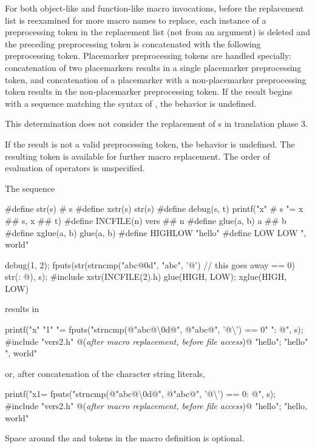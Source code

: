 \pnum
For both object-like and function-like macro invocations, before the
replacement list is reexamined for more macro names to replace,
each instance of a
\tcode{\#\#}
preprocessing token in the replacement list
(not from an argument) is deleted and the
preceding preprocessing token is concatenated
with the following preprocessing token.
Placemarker preprocessing tokens are handled specially: concatenation
of two placemarkers results in a single placemarker preprocessing token, and
concatenation of a placemarker with a non-placemarker preprocessing token results
in the non-placemarker preprocessing token.
If the result begins with a sequence matching the syntax of ,
the behavior is undefined.
\begin{note}
This determination does not consider the replacement of
s in translation phase 3.
\end{note}
If the result is not a valid preprocessing token,
the behavior is undefined.
The resulting token is available for further macro replacement.
The order of evaluation of
\tcode{\#\#}
operators is unspecified.

\pnum
\begin{example}
The sequence
\begin{codeblock}
#define str(s)      # s
#define xstr(s)     str(s)
#define debug(s, t) printf("x" # s "= %
               x ## s, x ## t)
#define INCFILE(n)  vers ## n
#define glue(a, b)  a ## b
#define xglue(a, b) glue(a, b)
#define HIGHLOW     "hello"
#define LOW         LOW ", world"

debug(1, 2);
fputs(str(strncmp("abc@\textbackslash@0d", "abc", '@')        // this goes away
    == 0) str(: @\atsign\textbackslash@n), s);
#include xstr(INCFILE(2).h)
glue(HIGH, LOW);
xglue(HIGH, LOW)
\end{codeblock}
results in
\begin{codeblock}
printf("x" "1" "= %
fputs("strncmp(@\textbackslash@"abc@\textbackslash\textbackslash@0d@\textbackslash@", @\textbackslash@"abc@\textbackslash@", '@\textbackslash{}') == 0" ": @\atsign\textbackslash@n", s);
#include "vers2.h"      @\textrm{(\textit{after macro replacement, before file access})}@
"hello";
"hello" ", world"
\end{codeblock}
or, after concatenation of the character string literals,
\begin{codeblock}
printf("x1= %
fputs("strncmp(@\textbackslash@"abc@\textbackslash\textbackslash@0d@\textbackslash@", @\textbackslash@"abc@\textbackslash@", '@\textbackslash{}') == 0: @\atsign\textbackslash@n", s);
#include "vers2.h"      @\textrm{(\textit{after macro replacement, before file access})}@
"hello";
"hello, world"
\end{codeblock}

Space around the \tcode{\#} and \tcode{\#\#} tokens in the macro definition
is optional.
\end{example}

